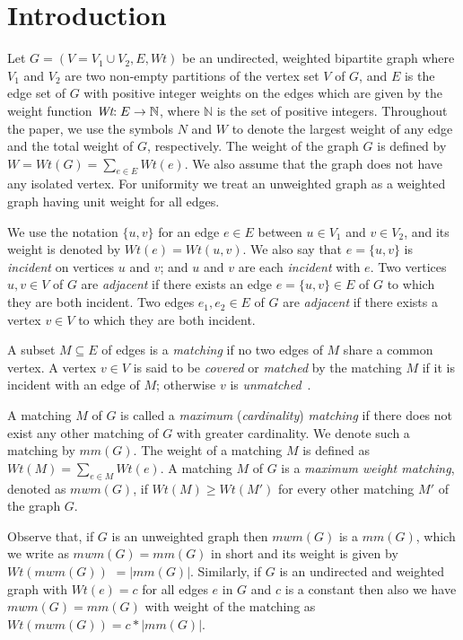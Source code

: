 \documentclass[runningheads,a4paper]{llncs}
\newcommand{\cln}{\text{:\;}}
\begin{document}
\section{Introduction}
Let $G=(V = V_1 \cup V_2, E, \textit{Wt})$
be an undirected, weighted bipartite graph 
where $V_1$ and $V_2$ are two non-empty partitions of the vertex set $V$ of $G$, and $E$ is the edge set of $G$ with
positive integer weights on the edges which are given by the weight function 
$\textit{Wt} \cln E \rightarrow \mathbb{N} $, where $\mathbb{N}$ is the set of positive integers.  
Throughout the paper, we use the symbols $N$ and  $W$  to denote the largest weight of any edge and  the total weight of $G$, respectively.  
The weight of the graph $G$  is defined by
$W=\textit{Wt}(G)=  \sum_{e \in E} \textit{Wt}(e)$. 
We also assume that the graph does not have any isolated vertex. 
For uniformity we treat an unweighted
graph as a weighted graph having unit weight for all edges.


We use the notation $\{u,v\}$ for an edge $e \in E$ between $u \in V_1$ and $v \in V_2$, and its weight is denoted by $\textit{Wt}(e)=\textit{Wt}(u,v)$.
We also say that $e=\{u,v\}$ is \textit{incident} on vertices $u$ and $v$;
and $u$ and $v$ are each \textit{incident} with $e$.
Two vertices $u,v \in V$ of $G$ are \textit{adjacent} if there exists an edge $e=\{u,v\}\in E$ of $G$ to which they are both incident. 
Two edges $e_1,e_2 \in E$ of $G$  are  \textit{adjacent} if there exists a vertex $v\in V$ to which they are both incident. 

A subset $M \subseteq E$ of edges is a \emph{matching} if no two edges of $M$
share a common vertex. A vertex $v \in V$ is said to be \emph{covered} or
\emph{matched} by the matching $M$ if it is incident with an edge of
$M$; otherwise $v$ is \emph{unmatched}~\cite{bondy82,bondy08}.

A matching $M$ of $G$ is called a \textit{maximum} (\textit{cardinality}) \textit{matching} if there
does not exist any other matching of $G$ with greater cardinality. We denote such a
matching by $\textit{mm}(G)$. The weight of a matching $M$ is defined as
$\textit{Wt}(M) = \sum_{e \in M} \textit{Wt}(e)$. A matching $M$ of $G$ is a \emph{maximum weight
matching}, denoted as $mwm(G)$, if $\textit{Wt}(M) \geq \textit{Wt}(M')$ for every other matching
$M'$ of the graph $G$.



Observe that, if $G$ is an unweighted graph then $\textit{mwm}(G)$ is a $\textit{mm}(G)$, which we write as $\textit{mwm}(G)=\textit{mm}(G)$ in short and its
weight is given by $\textit{Wt}(\textit{mwm}(G))$ $=|\textit{mm}(G)|$. Similarly, if $G$ is an
undirected and weighted graph with $\textit{Wt}(e) = c$ for all edges $e$ in $G$
and $c$ is a constant then also we have $\textit{mwm}(G)=\textit{mm}(G)$ with weight of the
matching as $\textit{Wt}(\textit{mwm}(G))=c*|\textit{mm}(G)|$.
\end{document}
